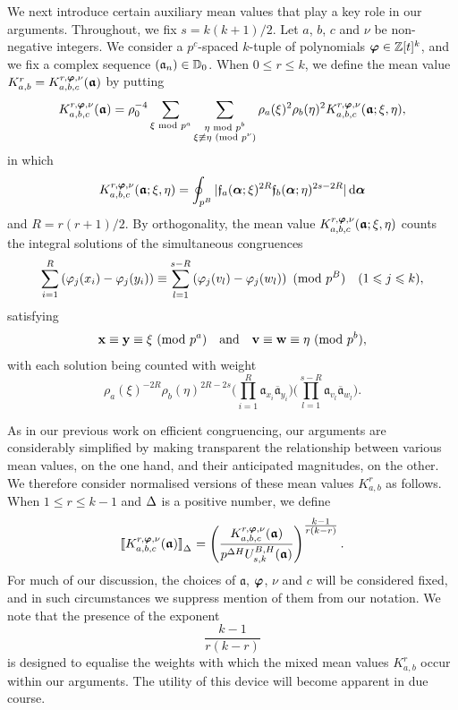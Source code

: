 \documentclass[12pt,reqno]{amsart}
\theoremstyle{definition}
\theoremstyle{remark}
\numberwithin{equation}{section}
\newcommand{\mmod}[1]{\,\,(\text{\rm mod}\,\,#1)}
\newcommand{\nmod}[1]{\,\,\text{\rm mod}\,\,#1}
\def\bfv{{\mathbf v}}
\def\bfw{{\mathbf w}}
\def\bfx{{\mathbf x}}
\def\bfy{{\mathbf y}}
\def\dbZ{{\mathbb Z}}\def\dbQ{{\mathbb Q}}
\def\gra{{\mathfrak a}}\def\grA{{\mathfrak A}}\def\bfgra{{\boldsymbol \gra}}
\def\grf{{\mathfrak f}}\def\grF{{\mathfrak F}}
\def\le{\leqslant} \def\ge{\geqslant} \def\pleq{\preccurlyeq} \def\ple{\prec}
\def\d{{\,{\rm d}}}
\newcommand{\rrbracketsub}[1]{\rrbracket_{\textstyle{_#1}}}
\begin{document}
\par We next introduce certain auxiliary mean values that play a key role in our 
arguments. Throughout, we fix $s=k(k+1)/2$. Let $a$, $b$, $c$ and $\nu$ be non-
negative integers. We consider a $p^c$-spaced $k$-tuple of polynomials 
$\bfvarphi\in \dbZ[t]^k$, and we fix a complex sequence $(\gra_n)\in \dbD_0$. When 
$0\le r\le k$, we define the mean value 
$K_{a,b}^r=K_{a,b,c}^{r,\bfvarphi,\nu}(\bfgra)$ by putting
\begin{equation}\label{3.19}
K_{a,b,c}^{r,\bfvarphi,\nu}(\bfgra)=\rho_0^{-4}\sum_{\xi\nmod{p^a}}
\sum_{\substack{\eta\nmod{p^b}\\ \xi\not\equiv \eta \mmod{p^\nu}}}\rho_a(\xi)^2
\rho_b(\eta)^2K_{a,b,c}^{r,\bfvarphi,\nu}(\bfgra;\xi,\eta),
\end{equation}
in which
\begin{equation}\label{3.20}
K_{a,b,c}^{r,\bfvarphi,\nu}(\bfgra;\xi,\eta)=\oint_{p^B}|\grf_a(\bfalp;\xi)^{2R}
\grf_b(\bfalp;\eta)^{2s-2R}|\d\bfalp 
\end{equation}
and $R=r(r+1)/2$. By orthogonality, the mean value 
$K_{a,b,c}^{r,\bfvarphi,\nu}(\bfgra;\xi,\eta)$ counts the 
integral solutions of the simultaneous congruences
\begin{equation}\label{3.21}
\sum_{i=1}^R\left(\varphi_j(x_i)-\varphi_j(y_i)\right)\equiv \sum_{l=1}^{s-R}
\left( \varphi_j(v_l)-\varphi_j(w_l)\right) \mmod{p^B}\quad (1\le j\le k),
\end{equation}
satisfying
\begin{equation}\label{3.22}
\bfx\equiv \bfy\equiv \xi\mmod{p^a}\quad \text{and}\quad \bfv\equiv 
\bfw\equiv \eta\mmod{p^b},
\end{equation}
with each solution being counted with weight
\begin{equation}\label{3.23}
\rho_a(\xi)^{-2R}\rho_b(\eta)^{2R-2s}\biggl( \prod_{i=1}^R\gra_{x_i}
{\overline \gra_{y_i}}\biggr) \biggl( \prod_{l=1}^{s-R}\gra_{v_l}
{\overline \gra_{w_l}}\biggr) .
\end{equation}

\par As in our previous work on efficient congruencing, our arguments are considerably 
simplified by making transparent the relationship between various mean values, on the 
one hand, and their anticipated magnitudes, on the other. We therefore consider 
normalised versions of these mean values $K_{a,b}^r$ as follows. When $1\le r\le k-1$ and 
${\Delta}$ is a positive number, we define
\begin{equation}\label{3.24}
\llbracket K_{a,b,c}^{r,\bfvarphi,\nu}(\bfgra)\rrbracketsub{\Del}=
\left( \frac{K_{a,b,c}^{r,\bfvarphi,\nu}(\bfgra)}{p^{\Del H}U_{s,k}^{B,H}(\bfgra)}
\right)^{\textstyle{\frac{k-1}{r(k-r)}}}.
\end{equation}
For much of our discussion, the choices of $\bfgra$, ${\boldsymbol \varphi}$, $\nu$ and $c$ will be 
considered fixed, and in such circumstances we suppress mention of them from our 
notation. We note that the presence of the exponent
$$\frac{k-1}{r(k-r)}$$
is designed to equalise the weights with which the mixed mean values $K_{a,b}^r$ 
occur within our arguments. The utility of this device will become apparent in due course.
\end{document}
